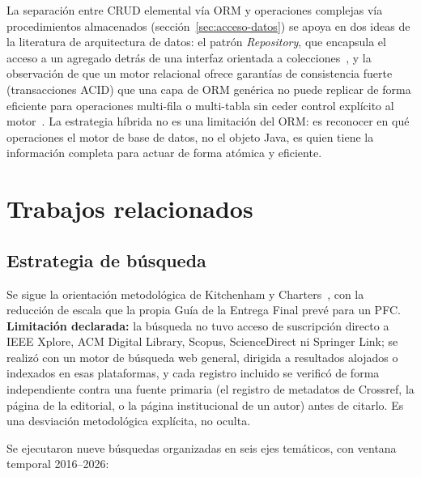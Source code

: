 \documentclass[11pt,a4paper]{article}
\begin{document}
La separación entre CRUD elemental vía ORM y operaciones complejas vía
procedimientos almacenados (sección~\ref{sec:acceso-datos}) se apoya en
dos ideas de la literatura de arquitectura de datos: el patrón
\emph{Repository}, que encapsula el acceso a un agregado detrás de una
interfaz orientada a colecciones~\cite{fowler2002}, y la observación de
que un motor relacional ofrece garantías de consistencia fuerte
(transacciones ACID) que una capa de ORM genérica no puede replicar de
forma eficiente para operaciones multi-fila o multi-tabla sin ceder
control explícito al motor~\cite{kleppmann2017}. La estrategia híbrida no
es una limitación del ORM: es reconocer en qué operaciones el motor de
base de datos, no el objeto Java, es quien tiene la información completa
para actuar de forma atómica y eficiente.

\section{Trabajos relacionados}
\label{sec:trabajos-relacionados}

\subsection{Estrategia de búsqueda}
\label{sec:estrategia-busqueda}

Se sigue la orientación metodológica de Kitchenham y
Charters~\cite{kitchenham2007}, con la reducción de escala que la propia
Guía de la Entrega Final prevé para un PFC. \textbf{Limitación declarada:}
la búsqueda no tuvo acceso de suscripción directo a IEEE Xplore, ACM
Digital Library, Scopus, ScienceDirect ni Springer Link; se realizó con un
motor de búsqueda web general, dirigida a resultados alojados o indexados
en esas plataformas, y cada registro incluido se verificó de forma
independiente contra una fuente primaria (el registro de metadatos de
Crossref, la página de la editorial, o la página institucional de un
autor) antes de citarlo. Es una desviación metodológica explícita, no
oculta.

Se ejecutaron nueve búsquedas organizadas en seis ejes temáticos, con
ventana temporal 2016--2026:
\end{document}
